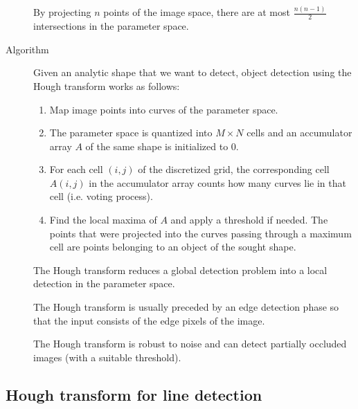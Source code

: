 \begin{description}
\begin{example}
            \indenttbox
            \begin{remark}
                By projecting $n$ points of the image space, there are at most $\frac{n(n-1)}{2}$ intersections in the parameter space.
            \end{remark}
        \end{example}

    \item[Algorithm] 
        Given an analytic shape that we want to detect, 
        object detection using the Hough transform works as follows:
        \begin{enumerate}
            \item Map image points into curves of the parameter space.
            \item The parameter space is quantized into $M \times N$ cells and an accumulator array $A$ of the same shape is initialized to $0$.
            \item For each cell $(i, j)$ of the discretized grid, 
                the corresponding cell $A(i, j)$ in the accumulator array counts how many curves lie in that cell (i.e. voting process).
            \item Find the local maxima of $A$ and apply a threshold if needed.
                The points that were projected into the curves passing through a maximum cell are points belonging to an object of the sought shape.
        \end{enumerate}
        
        \begin{remark}
            The Hough transform reduces a global detection problem into a local detection in the parameter space.
        \end{remark}

        \begin{remark}
            The Hough transform is usually preceded by an edge detection phase so that the input consists of the edge pixels of the image.
        \end{remark}

        \begin{remark}
            The Hough transform is robust to noise and can detect partially occluded images (with a suitable threshold).
        \end{remark}
\end{description}


\subsection{Hough transform for line detection}

